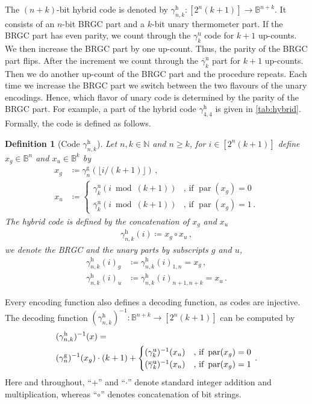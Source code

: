\documentclass[9pt,journal,compsoc]{IEEEtran}
\newtheorem{definition}[theorem]{Definition}
\theoremstyle{remark}
\DeclareMathOperator{\parity}{par}
\newcommand{\IN}{\mathbb{N}}
\newcommand{\IB}{\mathbb{B}}
\newcommand{\floor}[1]{\lfloor{#1}\rfloor}
\newcommand{\gBRGC}[1]{\gamma_{#1}^{\operatorname{g}}}
\newcommand{\gUnary}[1]{\gamma_{#1}^{\operatorname{u}}}
\newcommand{\gbUnary}[1]{\overline{\gamma}_{#1}^{\operatorname{u}}}
\newcommand{\gHyb}[1]{\gamma_{#1}^{\operatorname{h}}}
\begin{document}
The $(n+k)$-bit hybrid code is denoted by
  $\gHyb{n,k}\colon[2^n(k+1)]\rightarrow\IB^{n+k}$.
It consists of an $n$-bit BRGC part and a $k$-bit
  unary thermometer part.
If the BRGC part has even parity, we count through the $\gUnary{k}$ code for
  $k+1$ up-counts.
We then increase the BRGC part by one up-count.
Thus, the parity of the BRGC part flips.
After the increment we count through the $\gbUnary{k}$ part for
  $k+1$ up-counts.
Then we do another up-count of the BRGC part and the procedure repeats.
Each time we increase the BRGC part we switch between the two flavours of the
  unary encodings.
Hence, which flavor of unary code is determined by the parity of the BRGC part.
For example, a part of the hybrid code $\gHyb{4,4}$ is given in \cref{tab:hybrid}.
Formally, the code is defined as follows.

\begin{definition}[Code $\gHyb{n,k}$]\label{def:hybrid}
  Let $n,k\in\IN$ and $n\geq k$, for $i\in [2^{n}(k+1)]$ define $x_g\in\IB^{n}$ and $x_u\in\IB^{k}$ by
  \begin{align*}
    x_g &\coloneqq \gBRGC{n}(\floor{i/(k+1)})\,,\\
    x_u &\coloneqq
    \begin{cases}
      \gUnary{k}(i\bmod(k+1)) &\text{, if }\parity(x_g)=0\\
      \gbUnary{k}(i\bmod(k+1)) &\text{, if }\parity(x_g)=1\,.
    \end{cases}
  \end{align*}
  The hybrid code is defined by the concatenation of $x_g$ and $x_u$
  \begin{align*}
    \gHyb{n,k}(i)\coloneqq x_g \circ x_u\,,
  \end{align*}
  we denote the BRGC and the unary parts by subscripts $g$ and $u$,
  \begin{align*}
    \gHyb{n,k}(i)_g &\coloneqq \gHyb{n,k}(i)_{1,n}=x_g\,,\\
    \gHyb{n,k}(i)_u &\coloneqq \gHyb{n,k}(i)_{n+1,n+k}=x_u\,.
  \end{align*}
\end{definition}

Every encoding function also defines a decoding function, as codes are injective.
The decoding function $(\gHyb{n,k})^{-1}\colon\IB^{n+k}\rightarrow[2^{n}(k+1)]$
  can be computed by
\begin{align}
  &(\gHyb{n,k})^{-1}(x) = \label{eqn:dec}\\
  &(\gBRGC{n})^{-1}(x_g) \cdot (k+1) +
  \begin{cases}
    (\gUnary{k})^{-1}(x_u) &\text{, if }\parity(x_g)=0\\
    (\gbUnary{k})^{-1}(x_u) &\text{, if }\parity(x_g)=1
  \end{cases}\,. \notag
\end{align}
Here and throughout, ``$+$'' and ``$\cdot$'' denote standard integer addition and multiplication, whereas ``$\circ$'' denotes concatenation of bit strings.%
\end{document}
